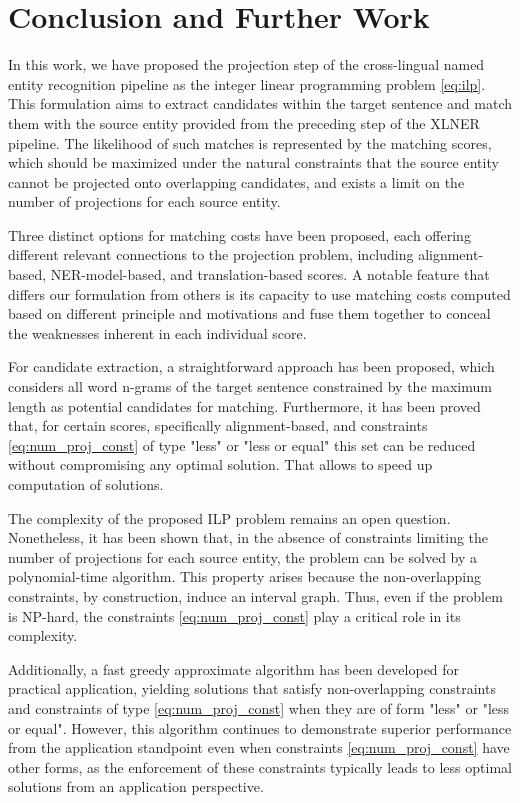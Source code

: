 \chapter{Conclusion and Further Work}
\label{sec:conclusion}

In this work, we have proposed the projection step of the cross-lingual named entity recognition
pipeline as the integer linear programming problem \eqref{eq:ilp}.
This formulation aims to extract candidates within the target sentence and match them
with the source entity provided from the preceding step of the XLNER pipeline. The likelihood
of such matches is represented by the matching scores, which should be maximized under
the natural constraints that the source entity cannot be projected onto overlapping candidates,
and exists a limit on the number of projections for each source entity.

Three distinct options for matching costs have been proposed, each offering different relevant
connections to the projection problem, including alignment-based, NER-model-based, and translation-based scores.
A notable feature that differs our formulation from others is its capacity to use matching costs
computed based on different principle and motivations and fuse them together to conceal the weaknesses
inherent in each individual score.

For candidate extraction, a straightforward approach has been proposed, which considers all word
n-grams of the target sentence constrained by the maximum length as potential candidates for matching.
Furthermore, it has been proved that, for certain scores, specifically alignment-based,
and constraints \eqref{eq:num_proj_const} of type "less" or "less or equal" this
set can be reduced without compromising any optimal solution. That allows
to speed up computation of solutions.

The complexity of the proposed ILP problem remains an open question. Nonetheless, it has been
shown that, in the absence of constraints limiting the number of projections for each source
entity, the problem can be solved by a polynomial-time algorithm. This property arises because the
non-overlapping constraints, by construction, induce an interval graph. Thus, even if the problem is NP-hard,
the constraints \eqref{eq:num_proj_const} play a critical role in its complexity.

Additionally, a fast greedy approximate algorithm has been developed for practical application,
yielding solutions that satisfy non-overlapping constraints and constraints of
type \eqref{eq:num_proj_const} when they are of form "less" or "less or equal". However, this algorithm continues
to demonstrate superior performance from the application standpoint even when constraints \eqref{eq:num_proj_const} have other forms, as the
enforcement of these constraints typically leads to less optimal solutions from an application
perspective.

